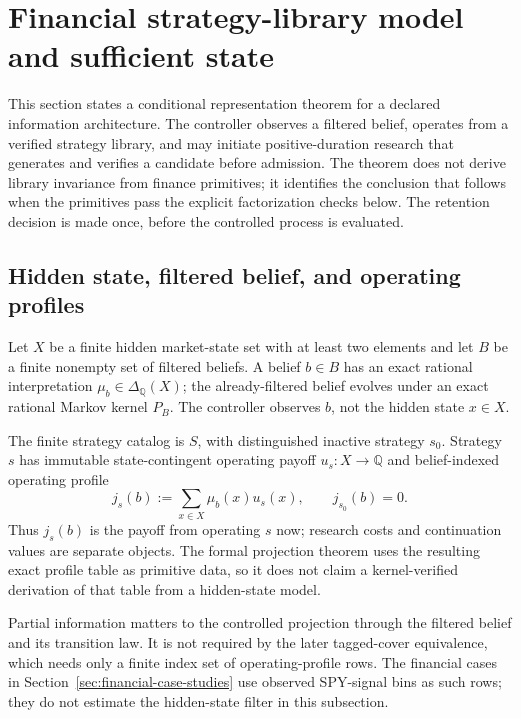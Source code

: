 \section{Financial strategy-library model and sufficient state}
\label{sec:model}
\label{sec:model-projection}

This section states a conditional representation theorem for a declared
information architecture. The controller observes a filtered belief, operates
from a verified strategy library, and may initiate positive-duration research
that generates and verifies a candidate before admission. The theorem does not
derive library invariance from finance primitives; it identifies the conclusion
that follows when the primitives pass the explicit factorization checks below.
The retention decision is made once, before the controlled process is evaluated.

\subsection{Hidden state, filtered belief, and operating profiles}

Let \(X\) be a finite hidden market-state set with at least two elements and
let \(B\) be a finite nonempty set of filtered beliefs.  A belief
\(b\in B\) has an exact rational interpretation
\(\mu_b\in\Delta_{\mathbb Q}(X)\); the already-filtered belief evolves under
an exact rational Markov kernel \(P_B\).  The controller observes \(b\), not
the hidden state \(x\in X\).

The finite strategy catalog is \(S\), with distinguished inactive strategy
\(s_0\).  Strategy \(s\) has immutable state-contingent operating payoff
\(u_s:X\to\mathbb Q\) and belief-indexed operating profile
\begin{equation}
  j_s(b):=\sum_{x\in X}\mu_b(x)u_s(x),
  \qquad j_{s_0}(b)=0.
  \label{eq:operational-profile}
\end{equation}
Thus \(j_s(b)\) is the payoff from operating \(s\) now; research costs and
continuation values are separate objects.  The formal projection theorem uses
the resulting exact profile table as primitive data, so it does not claim a
kernel-verified derivation of that table from a hidden-state model.

Partial information matters to the controlled projection through the filtered
belief and its transition law. It is not required by the later tagged-cover
equivalence, which needs only a finite index set of operating-profile rows. The
financial cases in Section~\ref{sec:financial-case-studies} use observed
SPY-signal bins as such rows; they do not estimate the hidden-state filter in
this subsection.

